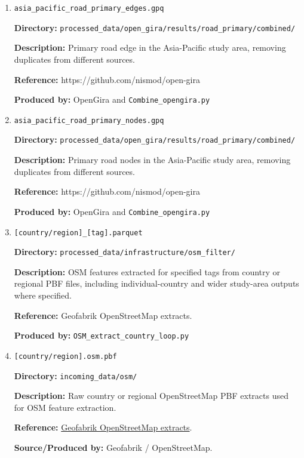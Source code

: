 \documentclass[11pt,a4paper]{article}
\begin{document}
\begin{enumerate}
\medskip

\item \texttt{asia\_pacific\_road\_primary\_edges.gpq}\par
\textbf{Directory:} \texttt{processed\_data/open\_gira/results/road\_primary/combined/}\par
\textbf{Description:} Primary road edge in the Asia-Pacific study area, removing duplicates from different sources.\par
\textbf{Reference:} https://github.com/nismod/open-gira\par
\textbf{Produced by:} OpenGira and \texttt{Combine\_opengira.py}\par

\medskip

\item \texttt{asia\_pacific\_road\_primary\_nodes.gpq}\par
\textbf{Directory:} \texttt{processed\_data/open\_gira/results/road\_primary/combined/}\par
\textbf{Description:} Primary road nodes in the Asia-Pacific study area, removing duplicates from different sources.\par
\textbf{Reference:} https://github.com/nismod/open-gira\par
\textbf{Produced by:} OpenGira and \texttt{Combine\_opengira.py}\par

\medskip

\item \texttt{[country/region]\_[tag].parquet}\par
\textbf{Directory:} \texttt{processed\_data/infrastructure/osm\_filter/}\par
\textbf{Description:} OSM features extracted for specified tags from country or regional PBF files, including individual-country and wider study-area outputs where specified.\par
\textbf{Reference:} Geofabrik OpenStreetMap extracts.\par
\textbf{Produced by:} \texttt{OSM\_extract\_country\_loop.py}\par

\medskip

\item \texttt{[country/region].osm.pbf}\par
\textbf{Directory:} \texttt{incoming\_data/osm/}\par
\textbf{Description:} Raw country or regional OpenStreetMap PBF extracts used for OSM feature extraction.\par
\textbf{Reference:} \href{https://download.geofabrik.de/index.html}{Geofabrik OpenStreetMap extracts}.\par
\textbf{Source/Produced by:} Geofabrik / OpenStreetMap.\par


\end{enumerate}
\end{document}
